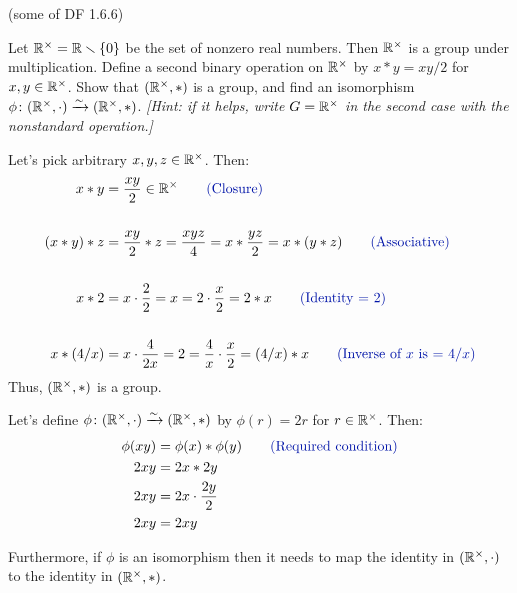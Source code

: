 \begin{problem}{\textsf{(some of DF 1.6.6)}}
  \begin{enumalph}
    \item Let $\mathbb{R}^\times = \mathbb{R} \smallsetminus \{0\}$ be the set of nonzero real numbers.
    Then $\mathbb{R}^\times$ is a group under multiplication.  Define a second binary operation
    on $\mathbb{R}^\times$ by $x*y=xy/2$ for $x,y \in \mathbb{R}^\times$.  Show that $(\mathbb{R}^\times,*)$ is
    a group, and find an isomorphism $\phi \colon (\mathbb{R}^\times,\cdot) \xrightarrow{\sim} 
    (\mathbb{R}^\times,*)$.  \emph{[Hint: if it helps, write $G=\mathbb{R}^\times$ in the second case 
    with the nonstandard operation.]}
    \begin{Answer}
      \item Let's pick arbitrary $x,y,z \in \mathbb{R}^\times$.  Then:
      \begin{align*}
        x*y &= \frac{xy}{2} \in \R^\times\qquad \zaff{(\text{Closure})} \\
        \\
        (x*y)*z &= \frac{xy}{2}*z = \frac{xyz}{4} = x*\frac{yz}{2} = x*(y*z)\qquad \zaff{(\text{Associative})}\\
        \\
        x * 2 &= x \cdot \frac{2}{2} = x = 2 \cdot \frac{x}{2} = 2 * x\qquad \zaff{(\text{Identity = $2$})} \\
        \\
        x * (4/x) &= x \cdot \frac{4}{2x} = 2 = \frac{4}{x}\cdot \frac{x}{2} = (4/x) * x\qquad \zaff{(\text{Inverse of $x$ is = $4/x$})} \\
      \end{align*}
      Thus, $(\mathbb{R}^\times,*)$ is a group.
      
      \noindent
      Let's define $\phi \colon (\mathbb{R}^\times,\cdot) \xrightarrow{\sim} 
      (\mathbb{R}^\times,*)$ by $\phi(r) = 2r$ for $r \in \mathbb{R}^\times$. Then:
      \begin{align*}
        \phi(xy) &= \phi(x) * \phi(y)\qquad \zaff{(\text{Required condition})}\\
        2xy &= 2x * 2y \\
        2xy &= 2x \cdot \frac{2y}{2} \\
        2xy &= 2xy\\
      \end{align*}

      \noindent
      Furthermore, if $\phi$ is an isomorphism then it needs to map
      the identity in $(\mathbb{R}^\times,\cdot)$ to the identity in $(\mathbb{R}^\times,*)$.


\end{Answer}
\end{enumalph}
\end{problem}
